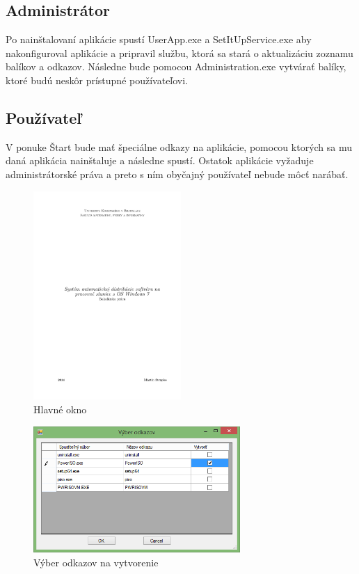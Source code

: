 \subsection{Administrátor}
Po nainštalovaní aplikácie spustí UserApp.exe a SetItUpService.exe aby nakonfiguroval aplikácie a pripravil službu, ktorá sa stará o aktualizáciu zoznamu balíkov a odkazov. Následne bude pomocou Administration.exe vytvárať balíky, ktoré budú neskôr prístupné používateľovi.

\subsection{Používateľ}
V ponuke Štart bude mať špeciálne odkazy na aplikácie, pomocou ktorých sa mu daná aplikácia nainštaluje a následne spustí. Ostatok aplikácie vyžaduje administrátorské práva a preto s ním obyčajný používateľ nebude môcť narábať.
\begin{figure}[h]
    \centering
    \includegraphics[width=0.5\textwidth]{main}
    \caption{Hlavné okno}
    \label{fig:main}
\end{figure}
\begin{figure}[h]
    \centering
    \includegraphics[width=0.7\textwidth]{odkazy}
    \caption{Výber odkazov na vytvorenie}
    \label{fig:links}
\end{figure}

